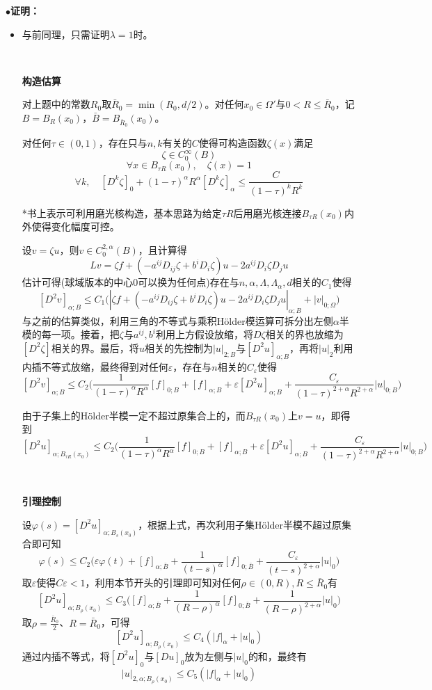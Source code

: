 \documentclass[a4paper,UTF8,fontset=windows,AutoFakeBold]{ctexart}
\newcommand{\proo}[1]{{\kaishu $\bullet$\textbf{证明：}
\begin{itemize}
    \item[] #1
\end{itemize}
}}
\begin{document}
\proo{
    与前同理，只需证明$\lambda=1$时。

    \

    \textbf{构造估算}

    对上题中的常数$R_0$取$\bar{R}_0=\min(R_0,d/2)$。对任何$x_0\in\Omega'$与$0<R\le\bar{R}_0$，记$B=B_R(x_0)$，$\bar{B}=B_{\bar{R}_0}(x_0)$。

    对任何$\tau\in(0,1)$，存在只与$n,k$有关的$C$使得可构造函数$\zeta(x)$满足
    $$\zeta\in C_0^\infty(B)$$
    $$\forall x\in B_{\tau R}(x_0),\quad\zeta(x)=1$$
    $$\forall k,\quad[D^k\zeta]_0+(1-\tau)^\alpha R^\alpha[D^k\zeta]_\alpha\le\frac{C}{(1-\tau)^kR^k}$$

    *书上表示可利用磨光核构造，基本思路为给定$\tau R$后用磨光核连接$B_{\tau R}(x_0)$内外使得变化幅度可控。

    设$v=\zeta u$，则$v\in C_0^{2,\alpha}(B)$，且计算得
    $$Lv=\zeta f+(-a^{ij}D_{ij}\zeta+b^iD_i\zeta)u-2a^{ij}D_i\zeta D_ju$$
    估计可得(球域版本的中心0可以换为任何点)存在与$n,\alpha,\Lambda,\Lambda_\alpha,d$相关的$C_1$使得
    $$[D^2v]_{\alpha;B}\le C_1\big(|\zeta f+(-a^{ij}D_{ij}\zeta+b^iD_i\zeta)u-2a^{ij}D_i\zeta D_ju|_{\alpha;B}+|v|_{0;\Omega}\big)$$
    与之前的估算类似，利用三角的不等式与乘积H\"older模运算可拆分出左侧$\alpha$半模的每一项。接着，把$\zeta$与$a^{ij},b^i$利用上方假设放缩，将$D\zeta$相关的界也放缩为$[D^2\zeta]$相关的界。最后，将$u$相关的先控制为$|u|_{2;B}$与$[D^2u]_{\alpha;B}$，再将$|u|_2$利用内插不等式放缩，最终得到对任何$\varepsilon$，存在与$n$相关的$C_\varepsilon$使得
    $$[D^2v]_{\alpha;B}\le C_2\bigg(\frac{1}{(1-\tau)^\alpha R^\alpha}[f]_{0;B}+[f]_{\alpha;B}+\varepsilon[D^2u]_{\alpha;B}+\frac{C_\varepsilon}{(1-\tau)^{2+\alpha}R^{2+\alpha}}|u|_{0;B}\bigg)$$

    由于子集上的H\"older半模一定不超过原集合上的，而$B_{\tau R}(x_0)$上$v=u$，即得到
    $$[D^2u]_{\alpha;B_{\tau R}(x_0)}\le C_2\bigg(\frac{1}{(1-\tau)^\alpha R^\alpha}[f]_{0;B}+[f]_{\alpha;B}+\varepsilon[D^2u]_{\alpha;B}+\frac{C_\varepsilon}{(1-\tau)^{2+\alpha}R^{2+\alpha}}|u|_{0;B}\bigg)$$

    \

    \textbf{引理控制}

    设$\varphi(s)=[D^2u]_{\alpha;B_s(x_0)}$，根据上式，再次利用子集H\"older半模不超过原集合即可知
    $$\varphi(s)\le C_2\bigg(\varepsilon\varphi(t)+[f]_{\alpha;\bar{B}}+\frac{1}{(t-s)^\alpha}[f]_{0;\bar{B}}+\frac{C_\varepsilon}{(t-s)^{2+\alpha}}|u|_0\bigg)$$
    取$\varepsilon$使得$C\varepsilon<1$，利用本节开头的引理即可知对任何$\rho\in(0,R),R\le\bar{R}_0$有
    $$[D^2u]_{\alpha;B_\rho(x_0)}\le C_3\bigg([f]_{\alpha;\bar{B}}+\frac{1}{(R-\rho)^\alpha}[f]_{0;\bar{B}}+\frac{1}{(R-\rho)^{2+\alpha}}|u|_0\bigg)$$
    取$\rho=\frac{\bar{R}_0}{2}$、$R=\bar{R}_0$，可得
    $$[D^2u]_{\alpha;B_\rho(x_0)}\le C_4(|f|_\alpha+|u|_0)$$
    通过内插不等式，将$[D^2u]_0$与$[Du]_0$放为左侧与$|u|_0$的和，最终有
    $$|u|_{2,\alpha;B_\rho(x_0)}\le C_5(|f|_\alpha+|u|_0)$$

}
\end{document}
